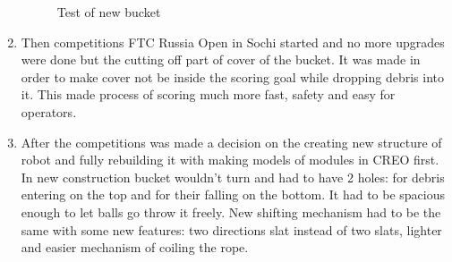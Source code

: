 \begin{enumerate}
\begin{figure}[H]
\begin{minipage}[h]{0.49\linewidth}
  	\caption{Test of new bucket}
  \end{minipage}
 \end{figure}
  
 \item Then competitions FTC Russia Open in Sochi started and no more upgrades were done but the cutting off part of cover of the bucket. It was made in order to make cover not be inside the scoring goal while dropping debris into it. This made process of scoring much more fast, safety and easy for operators.
 
 \item After the competitions was made a decision on the creating new structure of robot and fully rebuilding it with making models of modules in CREO first. In new construction bucket wouldn't turn and had to have 2 holes: for debris entering on the top and for their falling on the bottom. It had to be spacious enough to let balls go throw it freely. New shifting mechanism had to be the same with some new features: two directions slat instead of two slats, lighter and easier mechanism of coiling the rope.
 

\end{enumerate}
